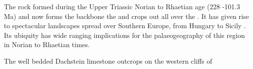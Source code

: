 The rock formed during the Upper Triassic Norian to Rhaetian age (228 -101.3\,Ma) and now forms the backbone the  \citep{bosellini1974triassic} and crops out all over the  \citep{fischer1975tidal,schwarzacher2005stratification}. It has given rise to spectacular landscapes spread over Southern Europe, from Hungary \citep{haas2004characteristics} to Sicily \citep{catalano1974ciclotemi}.
Its ubiquity has wide ranging implications for the palaeogeography of this region in Norian to Rhaetian times.

\begin{marginfigure}
\caption{The well bedded Dachstein limestone outcrops on the western cliffs of  }
\label{fig:dachstein}
\end{marginfigure}

